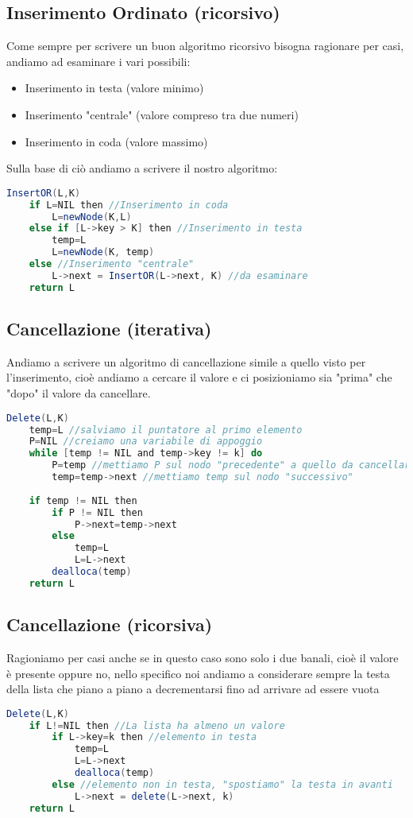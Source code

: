 \subsection{Inserimento Ordinato (ricorsivo)}
Come sempre per scrivere un buon algoritmo ricorsivo bisogna ragionare per casi, andiamo ad esaminare i vari possibili:
\begin{itemize}
\item Inserimento in testa (valore minimo)
\item Inserimento "centrale" (valore compreso tra due numeri)
\item Inserimento in coda (valore massimo)
\end{itemize}
Sulla base di ciò andiamo a scrivere il nostro algoritmo:
\begin{lstlisting}[language=Java]
InsertOR(L,K)
	if L=NIL then //Inserimento in coda
		L=newNode(K,L)
	else if [L->key > K] then //Inserimento in testa
		temp=L
		L=newNode(K, temp)
	else //Inserimento "centrale"
		L->next = InsertOR(L->next, K) //da esaminare
	return L 	
\end{lstlisting}

\subsection{Cancellazione (iterativa)}
Andiamo a scrivere un algoritmo di cancellazione simile a quello visto per l'inserimento, cioè andiamo a cercare il valore e ci posizioniamo sia "prima" che "dopo" il valore da cancellare.
\newpage
\begin{lstlisting}[language=Java]
Delete(L,K)
	temp=L //salviamo il puntatore al primo elemento
	P=NIL //creiamo una variabile di appoggio
	while [temp != NIL and temp->key != k] do 
		P=temp //mettiamo P sul nodo "precedente" a quello da cancellare
		temp=temp->next //mettiamo temp sul nodo "successivo"
		
	if temp != NIL then 
		if P != NIL then 
			P->next=temp->next
		else
			temp=L
			L=L->next
		dealloca(temp)
	return L 	
\end{lstlisting}

\subsection{Cancellazione (ricorsiva)}
Ragioniamo per casi anche se in questo caso sono solo i due banali, cioè il valore è presente oppure no, nello specifico noi andiamo a considerare sempre la testa della lista che piano a piano a decrementarsi fino ad arrivare ad essere vuota
\begin{lstlisting}[language=Java]
Delete(L,K)
	if L!=NIL then //La lista ha almeno un valore
		if L->key=k then //elemento in testa
			temp=L
			L=L->next
			dealloca(temp)
		else //elemento non in testa, "spostiamo" la testa in avanti
			L->next = delete(L->next, k)
	return L
\end{lstlisting}

